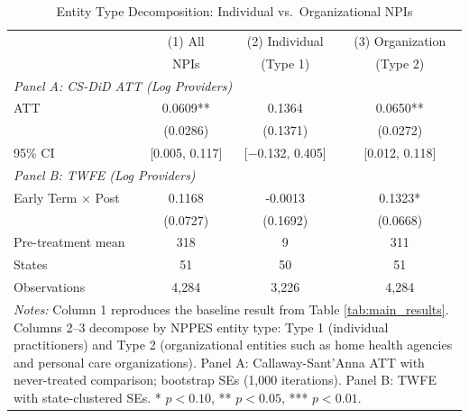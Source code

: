 \begin{table}[htbp]
\centering
\caption{Entity Type Decomposition: Individual vs.\ Organizational NPIs}
\label{tab:entity_type}
\begin{tabular}{lccc}
\hline\hline
 & (1) All & (2) Individual & (3) Organization \\
 & NPIs & (Type 1) & (Type 2) \\
\hline
\multicolumn{4}{l}{\textit{Panel A: CS-DiD ATT (Log Providers)}} \\
ATT & 0.0609** & 0.1364 & 0.0650** \\
 & (0.0286) & (0.1371) & (0.0272) \\
95\% CI & [0.005, 0.117] & [$-$0.132, 0.405] & [0.012, 0.118] \\
[6pt]
\multicolumn{4}{l}{\textit{Panel B: TWFE (Log Providers)}} \\
Early Term $\times$ Post & 0.1168 & -0.0013 & 0.1323* \\
 & (0.0727) & (0.1692) & (0.0668) \\
\hline
Pre-treatment mean & 318 & 9 & 311 \\
States & 51 & 50 & 51 \\
Observations & 4,284 & 3,226 & 4,284 \\
\hline\hline
\multicolumn{4}{p{13cm}}{\footnotesize \textit{Notes:} Column 1 reproduces the baseline result from Table \ref{tab:main_results}. Columns 2--3 decompose by NPPES entity type: Type 1 (individual practitioners) and Type 2 (organizational entities such as home health agencies and personal care organizations). Panel A: Callaway-Sant'Anna ATT with never-treated comparison; bootstrap SEs (1,000 iterations). Panel B: TWFE with state-clustered SEs. * $p<0.10$, ** $p<0.05$, *** $p<0.01$.} \\
\end{tabular}
\end{table}

